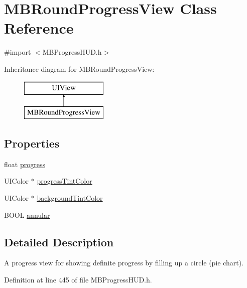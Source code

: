 \hypertarget{interface_m_b_round_progress_view}{\section{M\+B\+Round\+Progress\+View Class Reference}
\label{interface_m_b_round_progress_view}
}


{\ttfamily \#import $<$M\+B\+Progress\+H\+U\+D.\+h$>$}

Inheritance diagram for M\+B\+Round\+Progress\+View\+:\begin{figure}[H]
\begin{center}
\leavevmode
\includegraphics[height=2.000000cm]{interface_m_b_round_progress_view}
\end{center}
\end{figure}
\subsection*{Properties}
\begin{DoxyCompactItemize}
\item 
float \hyperlink{interface_m_b_round_progress_view_af92eeb35944c81f406571bc353dc5d5a}{progress}
\item 
U\+I\+Color $\ast$ \hyperlink{interface_m_b_round_progress_view_ae5c8d76a85810a3f843f262bdfff1163}{progress\+Tint\+Color}
\item 
U\+I\+Color $\ast$ \hyperlink{interface_m_b_round_progress_view_ab111d2fa027158e7c21ad411767d193a}{background\+Tint\+Color}
\item 
B\+O\+O\+L \hyperlink{interface_m_b_round_progress_view_abac11853dafb3f11426dab6d42834f9c}{annular}
\end{DoxyCompactItemize}


\subsection{Detailed Description}
A progress view for showing definite progress by filling up a circle (pie chart). 

Definition at line 445 of file M\+B\+Progress\+H\+U\+D.\+h.



